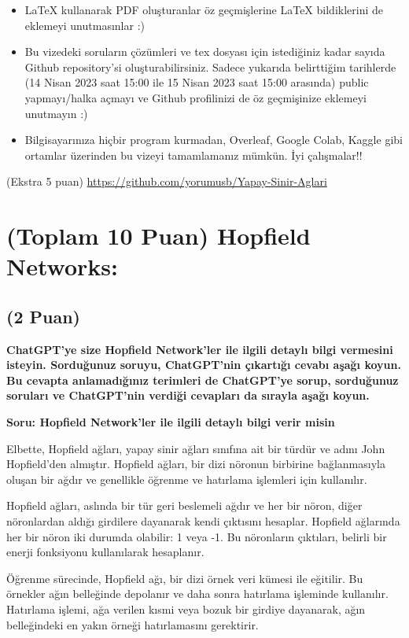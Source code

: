 \documentclass[11pt]{article}
\begin{document}
\begin{itemize}
    \item LaTeX kullanarak PDF oluşturanlar öz geçmişlerine LaTeX bildiklerini de eklemeyi unutmasınlar :)
    \item Bu vizedeki soruların çözümleri ve tex dosyası için istediğiniz kadar sayıda Github repository'si oluşturabilirsiniz. Sadece yukarıda belirttiğim tarihlerde (14 Nisan 2023 saat 15:00 ile 15 Nisan 2023 saat 15:00 arasında) public yapmayı/halka açmayı ve Github profilinizi de öz geçmişinize eklemeyi unutmayın :)
    \item Bilgisayarınıza hiçbir program kurmadan, Overleaf, Google Colab, Kaggle gibi ortamlar üzerinden bu vizeyi tamamlamanız mümkün. İyi çalışmalar!!
\end{itemize}

(Ekstra 5 puan) \url{https://github.com/yorumusb/Yapay-Sinir-Aglari}

\newpage
\section{(Toplam 10 Puan) Hopfield Networks:}

\subsection{(2 Puan)} \textbf{ChatGPT’ye size Hopfield Network’ler ile ilgili detaylı bilgi vermesini isteyin. Sorduğunuz soruyu, ChatGPT'nin çıkartığı cevabı aşağı koyun. Bu cevapta anlamadığınız terimleri de ChatGPT’ye sorup, sorduğunuz soruları ve ChatGPT’nin verdiği cevapları da sırayla aşağı koyun.}

\textbf{Soru: Hopfield Network’ler ile ilgili detaylı bilgi verir misin}


Elbette, Hopfield ağları, yapay sinir ağları sınıfına ait bir türdür ve adını John Hopfield'den almıştır. Hopfield ağları, bir dizi nöronun birbirine bağlanmasıyla oluşan bir ağdır ve genellikle öğrenme ve hatırlama işlemleri için kullanılır.

Hopfield ağları, aslında bir tür geri beslemeli ağdır ve her bir nöron, diğer nöronlardan aldığı girdilere dayanarak kendi çıktısını hesaplar. Hopfield ağlarında her bir nöron iki durumda olabilir: 1 veya -1. Bu nöronların çıktıları, belirli bir enerji fonksiyonu kullanılarak hesaplanır.

Öğrenme sürecinde, Hopfield ağı, bir dizi örnek veri kümesi ile eğitilir. Bu örnekler ağın belleğinde depolanır ve daha sonra hatırlama işleminde kullanılır. Hatırlama işlemi, ağa verilen kısmi veya bozuk bir girdiye dayanarak, ağın belleğindeki en yakın örneği hatırlamasını gerektirir.
\end{document}
